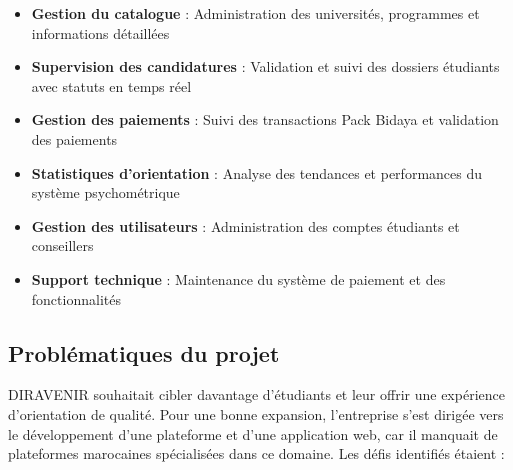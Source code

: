 \documentclass[12pt,a4paper]{report}
\begin{document}
\begin{itemize}
    \item \textbf{Gestion du catalogue} : Administration des universités, programmes et informations détaillées
    \item \textbf{Supervision des candidatures} : Validation et suivi des dossiers étudiants avec statuts en temps réel
    \item \textbf{Gestion des paiements} : Suivi des transactions Pack Bidaya et validation des paiements
    \item \textbf{Statistiques d'orientation} : Analyse des tendances et performances du système psychométrique
    \item \textbf{Gestion des utilisateurs} : Administration des comptes étudiants et conseillers
    \item \textbf{Support technique} : Maintenance du système de paiement et des fonctionnalités
\end{itemize}

\subsection{Problématiques du projet}

DIRAVENIR souhaitait cibler davantage d'étudiants et leur offrir une expérience d'orientation de qualité. Pour une bonne expansion, l'entreprise s'est dirigée vers le développement d'une plateforme et d'une application web, car il manquait de plateformes marocaines spécialisées dans ce domaine. Les défis identifiés étaient :
\end{document}

